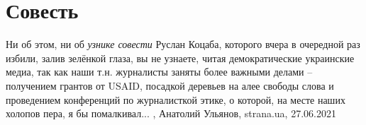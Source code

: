  
 
 
 
 
\chapter{Совесть}

Ни об этом, ни об \emph{узнике совести} Руслан Коцаба, которого вчера в очередной раз
избили, залив зелёнкой глаза, вы не узнаете, читая демократические украинские
медиа, так как наши т.н. журналисты заняты более важными делами – получением
грантов от USAID, посадкой деревьев на алее свободы слова и проведением
конференций по журналисткой этике, о которой, на месте наших холопов пера, я бы
помалкивал...
, 
Анатолий Ульянов, strana.ua, 27.06.2021
